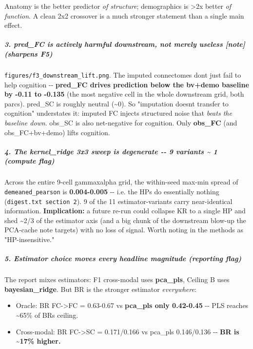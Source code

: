 Anatomy is the better predictor \emph{of structure}; demographics is \textgreater2x better \emph{of function}. A clean 2x2 crossover is a much stronger statement than a single main effect.

\subparagraph{\texorpdfstring{3. pred\_FC is \emph{actively harmful} downstream, not merely useless {[}note{]} (sharpens F5)}{3. pred\_FC is actively harmful downstream, not merely useless {[}note{]} (sharpens F5)}}\label{3-pred_fc-is-actively-harmful-downstream-not-merely-useless-note-sharpens-f5}

\texttt{figures/f3\_downstream\_lift.png}. The imputed connectomes don\textquotesingle t just fail to help cognition -\/- \textbf{pred\_FC drives prediction below the bv+demo baseline by -0.11 to -0.135} (the most negative cell in the whole downstream grid, both parcs). pred\_SC is roughly neutral (\textasciitilde0). So "imputation doesn\textquotesingle t transfer to cognition" understates it: imputed FC injects structured noise that \emph{beats the baseline down}. obs\_SC is also net-negative for cognition. Only \textbf{obs\_FC} (and obs\_FC+bv+demo) lifts cognition.

\subparagraph{4. The kernel\_ridge 3x3 sweep is degenerate -\/- 9 variants \textasciitilde{} 1 (compute flag)}\label{4-the-kernel_ridge-3x3-sweep-is-degenerate----9-variants--1-compute-flag}

Across the entire 9-cell gammaxalpha grid, the within-seed max-min spread of \texttt{demeaned\_pearson} is \textbf{0.004-0.005} -\/- i.e. the HPs do essentially nothing (\texttt{digest.txt\ section\ 2}). 9 of the 11 estimator-variants carry near-identical information. \textbf{Implication:} a future re-run could collapse KR to a single HP and shed \textasciitilde2/3 of the estimator axis (and a big chunk of the downstream blow-up the PCA-cache note targets) with no loss of signal. Worth noting in the methods as "HP-insensitive."

\subparagraph{5. Estimator choice moves every headline magnitude (reporting flag)}\label{5-estimator-choice-moves-every-headline-magnitude-reporting-flag}

The report mixes estimators: F1 cross-modal uses \textbf{pca\_pls}, Ceiling B uses \textbf{bayesian\_ridge}. But BR is the stronger estimator \emph{everywhere}:

\begin{itemize}
\tightlist
\item
  Oracle: BR FC-\textgreater FC = 0.63-0.67 vs \textbf{pca\_pls only 0.42-0.45} -\/- PLS reaches \textasciitilde65\% of BR\textquotesingle s ceiling.
\item
  Cross-modal: BR FC-\textgreater SC = 0.171/0.166 vs pca\_pls 0.146/0.136 -\/- \textbf{BR is \textasciitilde17\% higher.}
\end{itemize}

